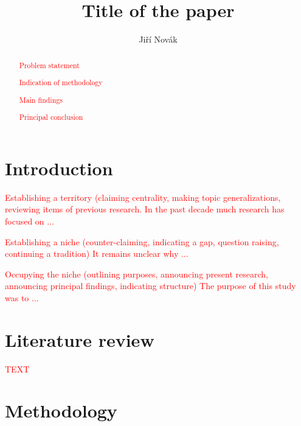 \documentclass{article}
\title{Title of the paper 
}
\author{Jiří Novák
        }
\begin{document}
\maketitle

\begin{abstract}
\textcolor{red}{Problem statement} 

\textcolor{red}{Indication of methodology} 

\textcolor{red}{Main findings} 

\textcolor{red}{Principal conclusion} 
\end{abstract}

\section{Introduction}

\textcolor{red}{Establishing a territory (claiming centrality, making topic generalizations, reviewing items of previous research.} 
\textcolor{red}{In the past decade much research has focused on ...} 

\textcolor{red}{Establishing a niche (counter-claiming, indicating a gap, question raising, continuing a tradition)} 
\textcolor{red}{It remains unclear why ...} 

\textcolor{red}{Occupying the niche (outlining purposes, announcing present research, announcing principal findings, indicating structure)} 
\textcolor{red}{The purpose of this study was to ...} 

\section{Literature review}

\textcolor{red}{TEXT} 

\section{Methodology}
\end{document}
